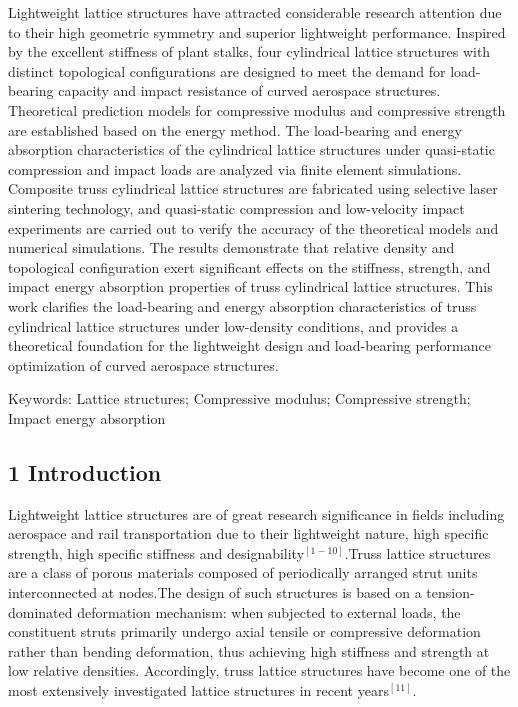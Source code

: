 \documentclass{article} %
\begin{document}
Lightweight lattice structures have attracted considerable research attention due to their high geometric symmetry and superior lightweight performance. Inspired by the excellent stiffness of plant stalks, four cylindrical lattice structures with distinct topological configurations are designed to meet the demand for load-bearing capacity and impact resistance of curved aerospace structures. Theoretical prediction models for compressive modulus and compressive strength are established based on the energy method. The load-bearing and energy absorption characteristics of the cylindrical lattice structures under quasi-static compression and impact loads are analyzed via finite element simulations. Composite truss cylindrical lattice structures are fabricated using selective laser sintering technology, and quasi-static compression and low-velocity impact experiments are carried out to verify the accuracy of the theoretical models and numerical simulations. The results demonstrate that relative density and topological configuration exert significant effects on the stiffness, strength, and impact energy absorption properties of truss cylindrical lattice structures. This work clarifies the load-bearing and energy absorption characteristics of truss cylindrical lattice structures under low-density conditions, and provides a theoretical foundation for the lightweight design and load-bearing performance optimization of curved aerospace structures.

\noindent Keywords: Lattice structures; Compressive modulus; Compressive strength; Impact energy absorption

\noindent 
\subsection{1  Introduction}

Lightweight lattice structures are of great research significance in fields including aerospace and rail transportation due to their lightweight nature, high specific strength, high specific stiffness and designability${}^{[1-10]}$.Truss lattice structures are a class of porous materials composed of periodically arranged strut units interconnected at nodes.The design of such structures is based on a tension-dominated deformation mechanism: when subjected to external loads, the constituent struts primarily undergo axial tensile or compressive deformation rather than bending deformation, thus achieving high stiffness and strength at low relative densities. Accordingly, truss lattice structures have become one of the most extensively investigated lattice structures in recent years${}^{[11]}$.
\end{document}
